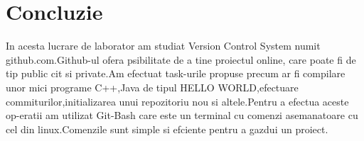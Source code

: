 \section*{Concluzie}

In acesta lucrare de laborator am studiat Version Control System numit github.com.Github-ul ofera psibilitate de a tine proiectul online, care poate fi de tip public cit si private.Am efectuat task-urile propuse precum ar fi compilare unor mici programe C++,Java de tipul HELLO WORLD,efectuare commiturilor,initializarea unui repozitoriu nou si altele.Pentru a efectua aceste op-eratii am utilizat Git-Bash care este un terminal cu comenzi asemanatoare cu cel din linux.Comenzile sunt simple si efciente pentru a gazdui un proiect.

\clearpage